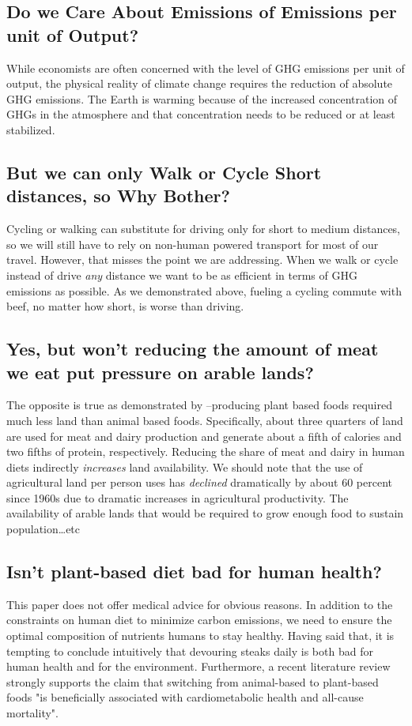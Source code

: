 \documentclass{article}[12pt,letterpaper]
\begin{document}
\subsection{Do we Care About Emissions of Emissions per unit of Output?}
While economists are often concerned with the level of GHG emissions per unit of output, the physical reality of climate change requires the reduction of absolute GHG emissions. The Earth is warming because of the increased concentration of GHGs in the atmosphere and that concentration needs to be reduced or at least stabilized.
\subsection{But we can only Walk or Cycle Short distances, so Why Bother?}
Cycling or walking can substitute for driving only for short to medium distances, so we will still have to rely on non-human powered transport for most of our travel. However, that misses the point we are addressing. When we walk or cycle instead of drive {\em any} distance we want to be as efficient in terms of GHG emissions as possible. As we demonstrated above, fueling a cycling commute with beef, no matter how short, is worse than driving.
\subsection{Yes, but won't reducing the amount of meat we eat put pressure on arable lands?}
The opposite is true as demonstrated by \citet{land-use} --producing plant based foods required much less land than animal based foods. Specifically, about three quarters of land are used for meat and dairy production and generate about a fifth of calories and two fifths of protein, respectively. Reducing the share of meat and dairy in human diets indirectly {\em increases} land availability. We should note that the use of agricultural land per person uses has {\em declined} dramatically by about 60 percent since 1960s due to dramatic increases in agricultural productivity.
The availability of arable lands that would be required to grow enough food to sustain population…etc
\subsection{Isn't plant-based diet bad for human health?}
This paper does not offer medical advice for obvious reasons. In addition to the constraints on human diet to minimize carbon emissions, we need to ensure the optimal composition of nutrients humans to stay healthy. Having said that, it is tempting to conclude intuitively that devouring steaks daily is both bad for human health and for the environment. Furthermore, a recent literature review \citet{Neuenschwander2023} strongly supports the claim that switching from animal-based to plant-based foods "is beneficially associated with cardiometabolic health and all-cause mortality".
\end{document}
